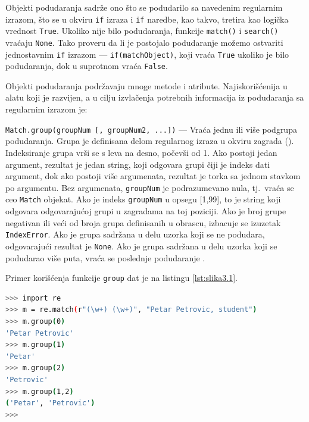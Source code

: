 \documentclass[12pt,oneside]{memoir}
\theoremstyle{plain}
\theoremstyle{definition}
\begin{document}
Objekti podudaranja sadrže ono što se podudarilo sa navedenim regularnim izrazom, što se u okviru \texttt{if} izraza i \texttt{if} naredbe, kao takvo, tretira kao logička vrednost \texttt{True}. Ukoliko nije bilo podudaranja, funkcije \texttt{match()} i \texttt{search()} vraćaju \texttt{None}. 
Tako proveru da li je postojalo podudaranje možemo ostvariti jednostavnim \texttt{if} izrazom --- \texttt{if(matchObject)}, koji vraća \texttt{True} ukoliko je bilo podudaranja, dok u suprotnom vraća \texttt{False}.

Objekti podudaranja podržavaju mnoge metode i atribute. Najiskorišćenija u alatu koji je razvijen, a u cilju izvlačenja potrebnih informacija iz podudaranja sa regularnim izrazom je:
\begin{description}
\item \texttt{Match.group(groupNum [, groupNum2, ...])} --- Vraća jednu ili više podgrupa podudaranja. Grupa je definisana delom regularnog izraza u okviru zagrada (). Indeksiranje grupa vrši se s leva na desno, počevši od 1. Ako postoji jedan argument, rezultat je jedan string, koji odgovara grupi čiji je indeks dati argument, dok ako postoji više argumenata, rezultat je torka sa jednom stavkom po argumentu. Bez argumenata, \texttt{groupNum} je  podrazumevano nula, tj.~vraća se ceo \texttt{Match} objekat. Ako je indeks \texttt{groupNum} u opsegu [1,99], to je string koji odgovara odgovarajućoj grupi u zagradama na toj poziciji. Ako je broj grupe negativan ili veći od broja grupa definisanih u obrascu, izbacuje se izuzetak \texttt{IndexError}. Ako je grupa sadržana u delu uzorka koji se ne podudara, odgovarajući rezultat je \texttt{None}. Ako je grupa sadržana u delu uzorka koji se podudarao više puta, vraća se poslednje podudaranje \cite{reModule}.
\end{description}

Primer korišćenja funkcije \texttt{group} dat je na listingu \ref{lst:slika3.1}.

\begin{lstlisting}[style=terminal,caption={Primer korišćenja funkcije \texttt{group} modula \texttt{re}}, label={lst:slika3.1},language={bash}] 
>>> import re
>>> m = re.match(r"(\w+) (\w+)", "Petar Petrovic, student")
>>> m.group(0)
'Petar Petrovic'
>>> m.group(1)
'Petar'
>>> m.group(2)
'Petrovic'
>>> m.group(1,2)
('Petar', 'Petrovic')
>>>
\end{lstlisting}
\end{document}
